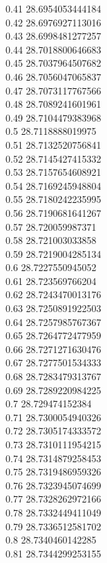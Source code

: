 {0.41	28.6954053444184\\
0.42	28.6976927113016\\
0.43	28.6998481277257\\
0.44	28.7018800646683\\
0.45	28.7037964507682\\
0.46	28.7056047065837\\
0.47	28.7073117767566\\
0.48	28.7089241601961\\
0.49	28.7104479383968\\
0.5	28.7118888019975\\
0.51	28.7132520756841\\
0.52	28.7145427415332\\
0.53	28.7157654608921\\
0.54	28.7169245948804\\
0.55	28.7180242235995\\
0.56	28.7190681641267\\
0.57	28.720059987371\\
0.58	28.721003033858\\
0.59	28.7219004285134\\
0.6	28.7227550945052\\
0.61	28.723569766204\\
0.62	28.7243470013176\\
0.63	28.7250891922503\\
0.64	28.7257985767367\\
0.65	28.7264772477959\\
0.66	28.7271271630476\\
0.67	28.7277501534333\\
0.68	28.7283479313767\\
0.69	28.7289220984225\\
0.7	28.729474152384\\
0.71	28.7300054940326\\
0.72	28.7305174333572\\
0.73	28.7310111954215\\
0.74	28.7314879258453\\
0.75	28.7319486959326\\
0.76	28.7323945074699\\
0.77	28.7328262972166\\
0.78	28.7332449411049\\
0.79	28.7336512581702\\
0.8	28.7340460142285\\
0.81	28.7344299253155\\
}
